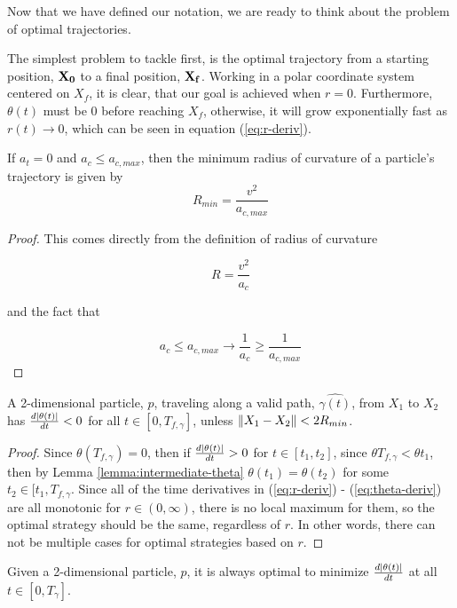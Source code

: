 Now that we have defined our notation, we are ready to think about the problem of optimal trajectories.

The simplest problem to tackle first, is the optimal trajectory from a starting position, $\mathbf{X_0}$ to a final position, $\mathbf{X_f}$. Working in a polar coordinate system centered on $X_f$, it is clear, that our goal is achieved when $r = 0$. Furthermore, $\theta(t)$ must be $0$ before reaching $X_f$, otherwise, it will grow exponentially fast as $r(t) \to 0$, which can be seen in equation (\ref{eq:r-deriv}).

\begin{lemma}
If $a_t=0$ and $a_c \le a_{c,max}$, then the minimum radius of curvature of a particle's trajectory is given by
\begin{equation}
R_{min} = \frac{v^2}{a_{c,max}}
\end{equation}
\end{lemma}

\begin{proof}
This comes directly from the definition of radius of curvature 

\[
R = \frac{v^2}{a_c}
\]

and the fact that 

\[
a_c \le a_{c,max} \to \frac{1}{a_c} \ge \frac{1}{a_{c,max}}
\]
\end{proof}

\begin{theorem}
A 2-dimensional particle, $p$, traveling along a valid path, $\hat{\gamma(t)}$, from $X_1$ to $X_2$ has $\frac{d\abs{\theta(t)}}{dt} < 0$ for all $t \in [0, T_{f, \gamma}]$, unless $\norm{X_1 - X_2} < 2 R_{min}$.
\end{theorem}

\begin{proof}
Since $\theta(T_{f,\gamma}) = 0$, then if $\frac{d\abs{\theta(t)}}{dt} > 0$ for $t \in [t_1, t_2]$, since $\theta{T_{f,\gamma}} < \theta{t_1}$, then by Lemma \ref{lemma:intermediate-theta} $\theta(t_1) = \theta(t_2)$ for some $t_2 \in [t_1, T_{f, \gamma}$. Since all of the time derivatives in (\ref{eq:r-deriv}) - (\ref{eq:theta-deriv}) are all monotonic for $r \in (0, \infty)$, there is no local maximum for them, so the optimal strategy should be the same, regardless of $r$. In other words, there can not be multiple cases for optimal strategies based on $r$.
\end{proof}

\begin{theorem}
Given a 2-dimensional particle, $p$, it is always optimal to minimize $\frac{d\abs{\theta(t)}}{dt}$ at all $t \in [0, T_{\gamma}]$.
\end{theorem}

